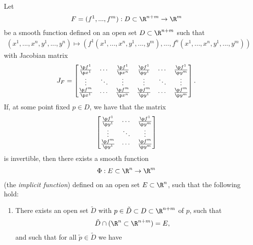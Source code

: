 \documentclass{article}
\begin{document}
\begin{theorem}
    Let  
    \begin{align*}
        F = (f^1,...,f^m):D\subset \R^{n+m}\to\R^m\\
    \end{align*} 
    be a smooth function defined on an open set $D\subset\R^{n+m}$ such that
    \begin{align*}
        (x^1,...,x^n,y^1,...,y^n)\mapsto (f^1(x^1,...,x^n,y^1,...,y^m), ..., f^n(x^1,...,x^n,y^1,...,y^m))
    \end{align*} 
    with Jacobian matrix
    \begin{align*}
        J_F = \begin{bmatrix}
            \frac{\p f^1}{\p x^1} & \cdots & \frac{\p f^1}{\p x^n}&\frac{\p f^1}{\p y^1} & \cdots &\frac{\p f^1}{\p y^m}\\
            \vdots & \ddots & \vdots & \vdots & \ddots & \vdots \\
            \frac{\p f^m}{\p x^1} & \cdots & \frac{\p f^m}{\p x^n}&\frac{\p f^m}{\p y^1} & \cdots &\frac{\p f^m}{\p y^m}
        \end{bmatrix}.
    \end{align*}
    If, at some point fixed $p\in D$, we have that the matrix 
    \begin{align*}
        \begin{bmatrix}
             \frac{\p f^1}{\p y^1} & \cdots & \frac{\p f^1}{\p y^m} \\
             \vdots & \ddots & \vdots \\
             \frac{\p f^m}{\p y^1} & \cdots & \frac{\p f^m}{\p y^m}
        \end{bmatrix}
    \end{align*}
    is invertible,
    then there exists a smooth function
    \begin{align*}
        \Phi : E \subset \R^n \to \R^m
    \end{align*}
    (the \emph{implicit function}) defined on an open set $E\subset \R^n$, such that 
    the following hold:
    \begin{enumerate}
        \item There exists an open set $\tilde D$ with $p\in \tilde D\subset D\subset\R^{n+m}$ of $p$, such that  \begin{align*}
            \tilde D \cap (\R^n\subset\R^{n+m})=E,
        \end{align*}
        and such that for all $\tilde p\in\tilde D$ we have \begin{align*}

\end{align*}
\end{enumerate}
\end{theorem}
\end{document}
